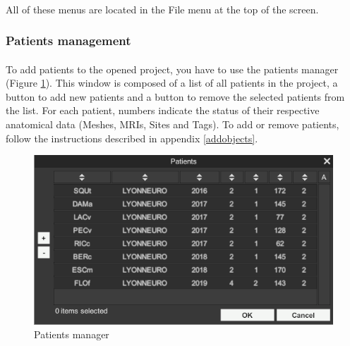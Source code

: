 \documentclass[a4paper]{article}
\begin{document}
\paragraph{} All of these menus are located in the File menu at the top of the screen.
\subsubsection{Patients management}
\paragraph{} To add patients to the opened project, you have to use the patients manager (Figure \ref{patientGestionUI}). This window is composed of a list of all patients in the project, a button to add new patients and a button to remove the selected patients from the list. For each patient, numbers indicate the status of their respective anatomical data (Meshes, MRIs, Sites and Tags). To add or remove patients, follow the instructions described in appendix \ref{addobjects}.
\begin{figure}[H]
\begin{center}
\includegraphics[scale=0.5]{PatientGestion.png}
\end{center}
\caption{\label{patientGestionUI}Patients manager}
\end{figure}
\end{document}
